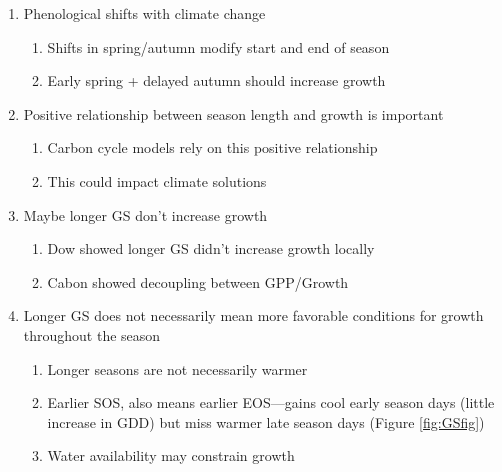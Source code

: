 \documentclass{article}\usepackage[]{graphicx}\usepackage[]{xcolor}
\begin{document}
\begin{enumerate}

\item Phenological shifts with climate change
  \begin{enumerate}
  
  \item Shifts in spring/autumn modify start and end of season \citep{parmesan_globally_2003,cleland_shifting_2007,lieth_phenology_1974,woolway_phenological_2021,menzel_european_2006}
  
  \item Early spring + delayed autumn should increase growth
  
  \end{enumerate}
  
\item Positive relationship between season length and growth is important
  \begin{enumerate}
  \item Carbon cycle models rely on this positive relationship
  
  \item This could impact climate solutions 
  
  \end{enumerate}

\item Maybe longer GS don't increase growth
  \begin{enumerate}
  
  \item Dow showed longer GS didn't increase growth locally
  
  \item Cabon showed decoupling between GPP/Growth
  
  \end{enumerate}

\item Longer GS does not necessarily mean more favorable conditions for growth throughout the season
  \begin{enumerate}
  
  \item Longer seasons are not necessarily warmer
  
  \item Earlier SOS, also means earlier EOS---gains cool early season days (little increase in GDD) but miss warmer late season days (Figure \ref{fig:GSfig})
  
  \item Water availability may constrain growth
  

\end{enumerate}
\end{enumerate}
\end{document}

